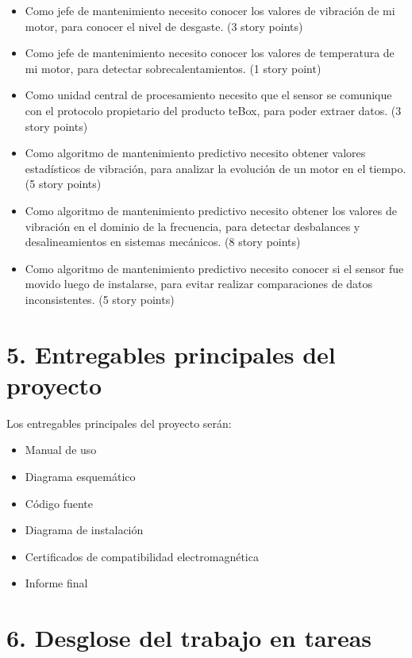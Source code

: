 \documentclass[11pt]{charter}
\begin{document}
\begin{itemize}
\item Como jefe de mantenimiento necesito conocer los valores de vibración de mi motor, para conocer el nivel de desgaste. (3 story points)
\item Como jefe de mantenimiento necesito conocer los valores de temperatura de mi motor, para detectar sobrecalentamientos. (1 story point)
\item Como unidad central de procesamiento necesito que el sensor se comunique con el protocolo propietario del producto teBox, para poder extraer datos. (3 story points)
\item Como algoritmo de mantenimiento predictivo necesito obtener valores estadísticos de vibración, para analizar la evolución de un motor en el tiempo. (5 story points)
\item Como algoritmo de mantenimiento predictivo necesito obtener los valores de vibración en el dominio de la frecuencia, para detectar desbalances y desalineamientos en sistemas mecánicos. (8 story points)
\item Como algoritmo de mantenimiento predictivo necesito conocer si el sensor fue movido luego de instalarse, para evitar realizar comparaciones de datos inconsistentes. (5 story points)
\end{itemize}


\section{5. Entregables principales del proyecto}
\label{sec:entregables}

Los entregables principales del proyecto serán:
\begin{itemize}
\item Manual de uso
\item Diagrama esquemático
\item Código fuente
\item Diagrama de instalación
\item Certificados de compatibilidad electromagnética
\item Informe final

\end{itemize}


\section{6. Desglose del trabajo en tareas}
\label{sec:wbs}
\end{document}
